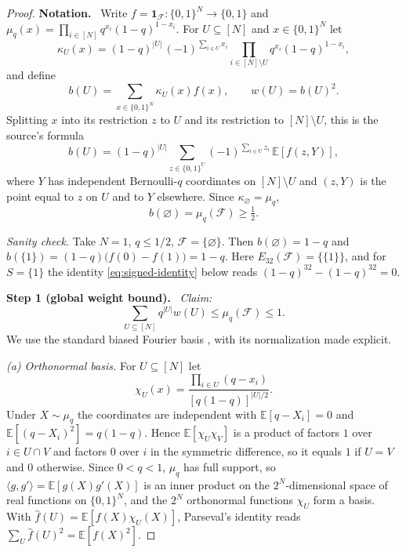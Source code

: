 \documentclass[11pt,letterpaper]{article}
\theoremstyle{definition}
\theoremstyle{remark}
\numberwithin{equation}{section}
\newcommand{\step}[1]{\medskip\noindent\textbf{#1.}\ }
\begin{document}
\begin{proof}
\step{Notation}
Write $f=\mathbf 1_{\mathcal F}:\{0,1\}^N\to\{0,1\}$ and
$\mu_q(x)=\prod_{i\in[N]}q^{x_i}(1-q)^{1-x_i}$. For $U\subseteq[N]$ and
$x\in\{0,1\}^N$ let
\begin{equation}\label{eq:kernel}
\kappa_U(x)=(1-q)^{|U|}\,(-1)^{\sum_{i\in U}x_i}
\prod_{i\in[N]\setminus U}q^{x_i}(1-q)^{1-x_i},
\end{equation}
and define
\begin{equation}\label{eq:b-def}
b(U)=\sum_{x\in\{0,1\}^N}\kappa_U(x)f(x),
\qquad w(U)=b(U)^2.
\end{equation}
Splitting $x$ into its restriction $z$ to $U$ and its restriction to
$[N]\setminus U$, this is the source's formula
\[
 b(U)=(1-q)^{|U|}
 \sum_{z\in\{0,1\}^{U}}(-1)^{\sum_{i\in U}z_i}\,
 \mathbb E[f(z,Y)],
\]
where $Y$ has independent Bernoulli-$q$ coordinates on $[N]\setminus U$ and
$(z,Y)$ is the point equal to $z$ on $U$ and to $Y$ elsewhere. Since
$\kappa_\varnothing=\mu_q$,
\[
b(\varnothing)=\mu_q(\mathcal F)\ge\tfrac12.
\]

\emph{Sanity check.} Take $N=1$, $q\le1/2$, $\mathcal F=\{\varnothing\}$. Then
$b(\varnothing)=1-q$ and $b(\{1\})=(1-q)\bigl(f(0)-f(1)\bigr)=1-q$. Here
$E_{32}(\mathcal F)=\{\{1\}\}$, and for $S=\{1\}$ the identity
\eqref{eq:signed-identity} below reads $(1-q)^{32}-(1-q)^{32}=0$.

\step{Step 1 (global weight bound)}
\emph{Claim:}
\begin{equation}\label{eq:global}
\sum_{U\subseteq[N]}q^{|U|}w(U)\le\mu_q(\mathcal F)\le1.
\end{equation}
We use the standard biased Fourier basis \cite[Section~8.4]{ODonnell14}, with
its normalization made explicit.

\emph{(a) Orthonormal basis.} For $U\subseteq[N]$ let
\[
 \chi_U(x)=\frac{\prod_{i\in U}(q-x_i)}{[q(1-q)]^{|U|/2}}.
\]
Under $X\sim\mu_q$ the coordinates are independent with
$\mathbb E[q-X_i]=0$ and $\mathbb E[(q-X_i)^2]=q(1-q)$. Hence
$\mathbb E[\chi_U\chi_V]$ is a product of factors $1$ over $i\in U\cap V$ and
factors $0$ over $i$ in the symmetric difference, so it equals $1$ if $U=V$
and $0$ otherwise. Since $0<q<1$, $\mu_q$ has full support, so
$\langle g,g'\rangle=\mathbb E[g(X)g'(X)]$ is an inner product on the
$2^N$-dimensional space of real functions on $\{0,1\}^N$, and the $2^N$
orthonormal functions $\chi_U$ form a basis. With
$\widehat f(U)=\mathbb E[f(X)\chi_U(X)]$, Parseval's identity reads
$\sum_U\widehat f(U)^2=\mathbb E[f(X)^2]$.


\end{proof}
\end{document}
